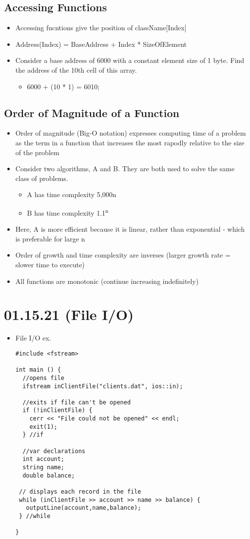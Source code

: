 \documentclass[11pt]{article}
\begin{document}
\subsection{Accessing Functions}
\label{sec:org076b13b}
\begin{itemize}
\item Accessing fucntions give the position of className[Index]
\item Address(Index) = BaseAddress + Index * SizeOfElement
\item Consider a base address of 6000 with a constant element size of 1 byte. Find the address of the 10th cell of this array.
\begin{itemize}
\item 6000 + (10 * 1) = 6010;
\end{itemize}
\end{itemize}
\subsection{Order of Magnitude of a Function}
\label{sec:org37d85d0}
\begin{itemize}
\item Order of magnitude (Big-O notation) expresses computing time of a problem as the term in a function that increases the most rapodly relative to the size of the problem
\item Consider two algorithms, A and B. They are both used to solve the same class of problems.
\begin{itemize}
\item A has time complexity 5,000n
\item B has time complexity 1.1\textsuperscript{n}
\end{itemize}
\item Here, A is more efficient because it is linear, rather than exponential - which is preferable for large n
\item Order of growth and time complexity are inverses (larger growth rate = slower time to execute)
\item All functions are monotonic (continue increasing indefinitely)
\end{itemize}
\section{01.15.21 (File I/O)}
\label{sec:orgc10b061}
\begin{itemize}
\item File I/O ex.
\begin{verbatim}
#include <fstream>

int main () {
  //opens file
  ifstream inClientFile("clients.dat", ios::in);

  //exits if file can't be opened
  if (!inClientFile) {
    cerr << "File could not be opened" << endl;
    exit(1);
  } //if

  //var declarations
  int account;
  string name;
  double balance;

 // displays each record in the file
 while (inClientFile >> account >> name >> balance) {
   outputLine(account,name,balance);
 } //while

}
\end{verbatim}
\end{itemize}
\end{document}
